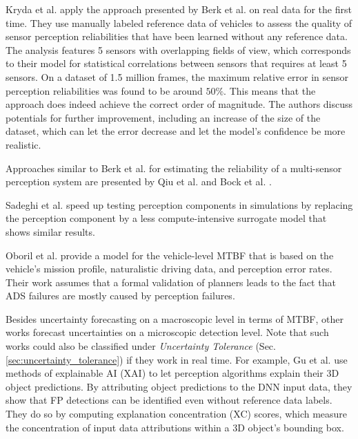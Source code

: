 \documentclass[conference]{IEEEtran}
\newcommand{\citeold}[1]{{\hypersetup{citecolor=black}\cite{#1}}}
\begin{document}
Kryda et al. \cite{Kryda2021} apply the approach presented by Berk et al. \citeold{berk2019exploiting} on real data for the first time. 
They use manually labeled reference data of vehicles to assess the quality of sensor perception reliabilities that have been learned without any reference data. 
The analysis features 5 sensors with overlapping fields of view, which corresponds to their model for statistical correlations between sensors that requires at least 5 sensors.
On a dataset of 1.5 million frames, the maximum relative error in sensor perception reliabilities was found to be around $50\%$.
This means that the approach does indeed achieve the correct order of magnitude. 
The authors discuss potentials for further improvement, including an increase of the size of the dataset, which can let the error decrease and let the model's confidence be more realistic. 



Approaches similar to Berk et al. \citeold{berk2019exploiting} for estimating the reliability of a multi-sensor perception system are presented by Qiu et al. \cite{Qiu2021reliability} and Bock et al. \cite{Bock2018reliability}.

Sadeghi et al. \cite{Sadeghi2021surrogate} speed up testing perception components in simulations by replacing the perception component by a less compute-intensive surrogate model that shows similar results. 



Oboril et al. \cite{Oboril2022mtbf_ieee} provide a model for the vehicle-level MTBF that is based on the vehicle's mission profile, naturalistic driving data, and perception error rates. 
Their work assumes that a formal validation of planners leads to the fact that ADS failures are mostly caused by perception failures.


Besides uncertainty forecasting on a macroscopic level in terms of MTBF, other works forecast uncertainties on a microscopic detection level. 
Note that such works could also be classified under \textit{Uncertainty Tolerance} (Sec. \ref{sec:uncertainty_tolerance}) if they work in real time.
For example, Gu et al. \cite{Gu2022explanations} use methods of explainable AI (XAI) to let perception algorithms explain their 3D object predictions. 
By attributing object predictions to the DNN input data, they show that FP detections can be identified even without reference data labels. 
They do so by computing explanation concentration (XC) scores, which measure the concentration of input data attributions within a 3D object's bounding box. 
\end{document}
